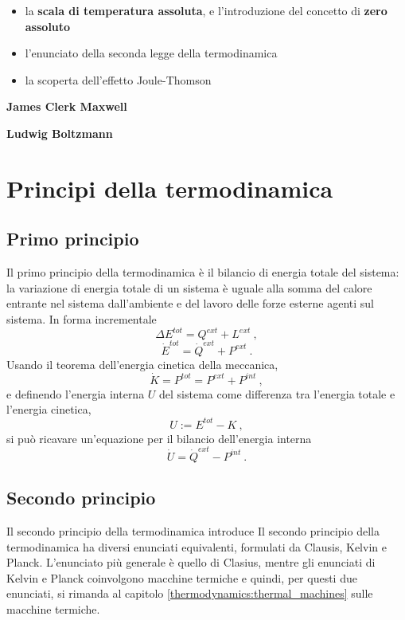 \begin{itemize}
        \begin{itemize}
            \item la \textbf{scala di temperatura assoluta}, e l'introduzione del concetto di \textbf{zero assoluto}
            \item l'enunciato della seconda legge della termodinamica
            \item la scoperta dell'effetto Joule-Thomson
        \end{itemize}
    {\color{red}
    \item \textbf{James Clerk Maxwell}
    \item \textbf{Ludwig Boltzmann}
    }
\end{itemize}


\chapter{Principi della termodinamica}\label{thermodynamics:principles}
\section{Primo principio}
Il primo principio della termodinamica è il bilancio di energia totale del sistema: la variazione di energia totale di un sistema è uguale alla somma del calore entrante nel sistema dall'ambiente e del lavoro delle forze esterne agenti sul sistema. In forma incrementale
\begin{equation}
  \Delta E^{tot} = Q^{ext} + L^{ext} \ ,
\end{equation}
\begin{equation}
  \dot{E}^{tot} = \dot{Q}^{ext} + P^{ext} \ .
\end{equation}
%
Usando il teorema dell'energia cinetica della meccanica,
\begin{equation}
  \dot{K} = P^{tot} = P^{ext} + P^{int} \ ,
\end{equation}
e definendo l'energia interna $U$ del sistema come differenza tra l'energia totale e l'energia cinetica,
\begin{equation}
  U := E^{tot} - K \ ,
\end{equation}
si può ricavare un'equazione per il bilancio dell'energia interna
\begin{equation}
  \dot{U} = \dot{Q}^{ext} - P^{int} \ .
\end{equation}

\section{Secondo principio}
Il secondo principio della termodinamica introduce
Il secondo principio della termodinamica ha diversi enunciati equivalenti, formulati da Clausis, Kelvin e Planck.
L'enunciato più generale è quello di Clasius, mentre gli enunciati di Kelvin e Planck coinvolgono macchine termiche e quindi, per questi due enunciati, si rimanda al capitolo \ref{thermodynamics:thermal_machines} sulle macchine termiche.

